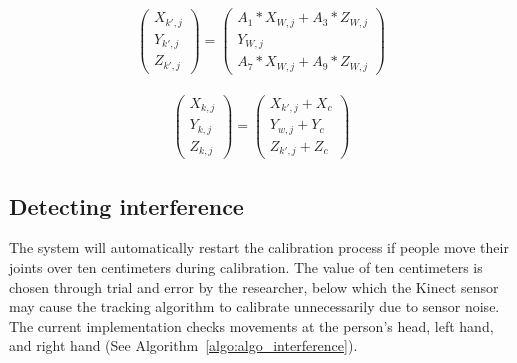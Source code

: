\begin{equation}
\label{eq:joint_kinect_3}
\begin{gathered}
  \begin{pmatrix}
  X_{k',j} \\
  Y_{k',j} \\
  Z_{k',j}
  \end{pmatrix} =
  \begin{pmatrix}
  A_1*X_{W,j}+A_3*Z_{W,j} \\
  Y_{W,j} \\
  A_7*X_{W,j}+A_9*Z_{W,j}
  \end{pmatrix}
\end{gathered}
\end{equation}

\begin{equation}
\label{eq:joint_kinect_4}
\begin{gathered}
 \begin{pmatrix}
  X_{k,j} \\
  Y_{k,j} \\
  Z_{k,j}
 \end{pmatrix} = 
 \begin{pmatrix}
  X_{k',j} + X_c\\
  Y_{w,j} + Y_c\\
  Z_{k',j} + Z_c
 \end{pmatrix}
\end{gathered}
\end{equation}

\subsection{Detecting interference}

The system will automatically restart the calibration process if people move their joints over ten centimeters during calibration. The value of ten centimeters is chosen through trial and error by the researcher, below which the Kinect sensor may cause the tracking algorithm to calibrate unnecessarily due to sensor noise. The current implementation checks movements at the person's head, left hand, and right hand (See Algorithm~\ref{algo:algo_interference}).

